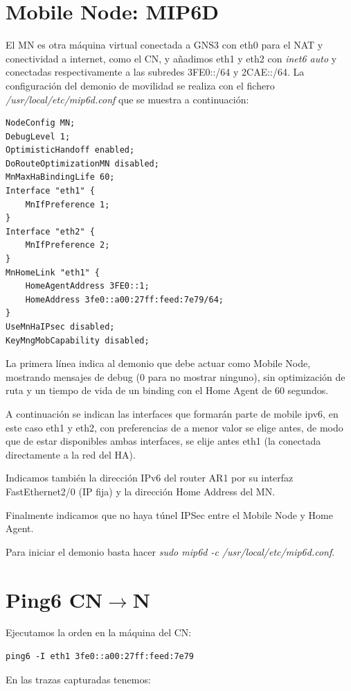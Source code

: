 \documentclass{article}
\begin{document}
\section{Mobile Node: MIP6D}

El MN es otra máquina virtual conectada a GNS3 con eth0 para el NAT y conectividad a internet, como el CN, y añadimos eth1 y eth2 con \textit{inet6 auto} y conectadas respectivamente a las subredes 3FE0::/64 y 2CAE::/64. La configuración del demonio de movilidad se realiza con el fichero \textit{/usr/local/etc/mip6d.conf} que se muestra a continuación:

\begin{lstlisting}
NodeConfig MN;
DebugLevel 1;
OptimisticHandoff enabled;
DoRouteOptimizationMN disabled;
MnMaxHaBindingLife 60;
Interface "eth1" {
	MnIfPreference 1;
}
Interface "eth2" {
	MnIfPreference 2;
}
MnHomeLink "eth1" {
	HomeAgentAddress 3FE0::1;
	HomeAddress 3fe0::a00:27ff:feed:7e79/64;
}
UseMnHaIPsec disabled;
KeyMngMobCapability disabled;
\end{lstlisting}

La primera línea indica al demonio que debe actuar como Mobile Node, mostrando mensajes de debug (0 para no mostrar ninguno), sin optimización de ruta y un tiempo de vida de un binding con el Home Agent de 60 segundos.

A continuación se indican las interfaces que formarán parte de mobile ipv6, en este caso eth1 y eth2, con preferencias de a menor valor se elige antes, de modo que de estar disponibles ambas interfaces, se elije antes eth1 (la conectada directamente a la red del HA).

Indicamos también la dirección IPv6 del router AR1 por su interfaz FastEthernet2/0 (IP fija) y la dirección Home Address del MN.

Finalmente indicamos que no haya túnel IPSec entre el Mobile Node y Home Agent.

Para iniciar el demonio basta hacer \textit{sudo mip6d -c /usr/local/etc/mip6d.conf}.


\section{Ping6 CN\texorpdfstring{$\rightarrow$}MN}
Ejecutamos la orden en la máquina del CN:

\begin{BVerbatim}
ping6 -I eth1 3fe0::a00:27ff:feed:7e79
\end{BVerbatim}

En las trazas capturadas tenemos:
\end{document}
